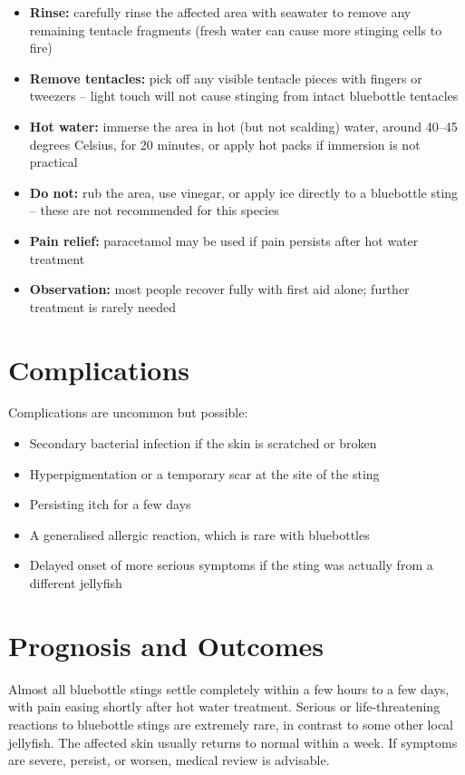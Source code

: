 \begin{itemize}
    \item \textbf{Rinse:} carefully rinse the affected area with seawater to remove any remaining tentacle fragments (fresh water can cause more stinging cells to fire)
    \item \textbf{Remove tentacles:} pick off any visible tentacle pieces with fingers or tweezers -- light touch will not cause stinging from intact bluebottle tentacles
    \item \textbf{Hot water:} immerse the area in hot (but not scalding) water, around 40--45 degrees Celsius, for 20 minutes, or apply hot packs if immersion is not practical
    \item \textbf{Do not:} rub the area, use vinegar, or apply ice directly to a bluebottle sting -- these are not recommended for this species
    \item \textbf{Pain relief:} paracetamol may be used if pain persists after hot water treatment
    \item \textbf{Observation:} most people recover fully with first aid alone; further treatment is rarely needed
\end{itemize}

\section*{Complications}
Complications are uncommon but possible:

\begin{itemize}
    \item Secondary bacterial infection if the skin is scratched or broken
    \item Hyperpigmentation or a temporary scar at the site of the sting
    \item Persisting itch for a few days
    \item A generalised allergic reaction, which is rare with bluebottles
    \item Delayed onset of more serious symptoms if the sting was actually from a different jellyfish
\end{itemize}

\section*{Prognosis and Outcomes}
Almost all bluebottle stings settle completely within a few hours to a few days, with pain easing shortly after hot water treatment. Serious or life-threatening reactions to bluebottle stings are extremely rare, in contrast to some other local jellyfish. The affected skin usually returns to normal within a week. If symptoms are severe, persist, or worsen, medical review is advisable.

